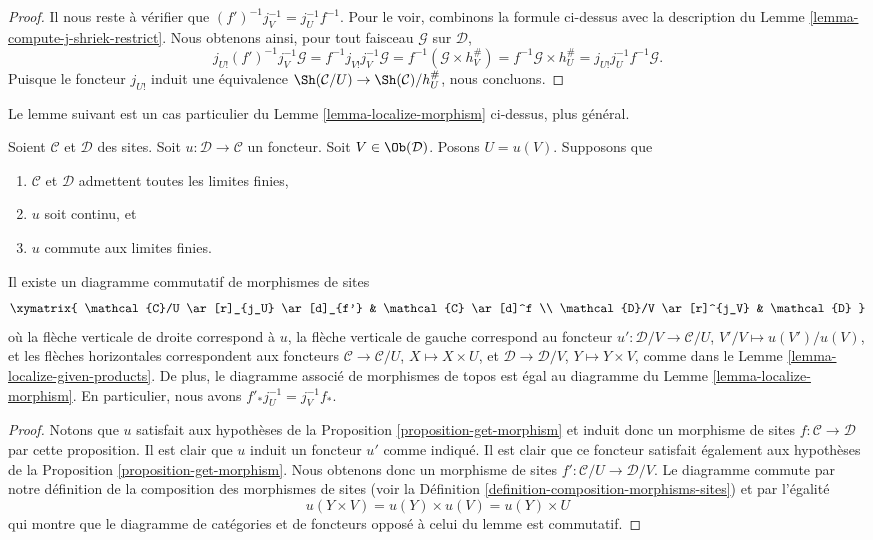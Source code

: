 \begin{proof}
\medskip\noindent
Il nous reste à vérifier que $(f')^{-1}j_V^{-1} = j_U^{-1}f^{-1}$.
Pour le voir, combinons la formule ci-dessus avec la description
du Lemme \ref{lemma-compute-j-shriek-restrict}. Nous obtenons ainsi,
pour tout faisceau $\mathcal{G}$ sur $\mathcal{D}$,
$$
j_{U!}(f')^{-1}j_V^{-1}\mathcal{G}
=
f^{-1}j_{V!}j_V^{-1}\mathcal{G}
=
f^{-1}(\mathcal{G} \times h_V^\#)
=
f^{-1}\mathcal{G} \times h_U^\#
=
j_{U!}j_U^{-1}f^{-1}\mathcal{G}.
$$
Puisque le foncteur $j_{U!}$ induit une équivalence
$\Sh(\mathcal{C}/U) \to \Sh(\mathcal{C})/h_U^\#$,
nous concluons.
\end{proof}

\noindent
Le lemme suivant est un cas particulier du
Lemme \ref{lemma-localize-morphism}
ci-dessus, plus général.

\begin{lemma}
\label{lemma-localize-morphism-strong}
Soient $\mathcal{C}$ et $\mathcal{D}$ des sites.
Soit $u : \mathcal{D} \to \mathcal{C}$ un foncteur.
Soit $V \in \Ob(\mathcal{D})$. Posons $U = u(V)$.
Supposons que
\begin{enumerate}
\item $\mathcal{C}$ et $\mathcal{D}$ admettent
toutes les limites finies,
\item $u$ soit continu, et
\item $u$ commute aux limites finies.
\end{enumerate}
Il existe un diagramme commutatif de morphismes de sites
$$
\xymatrix{
\mathcal{C}/U \ar[r]_{j_U} \ar[d]_{f'} & \mathcal{C} \ar[d]^f \\
\mathcal{D}/V \ar[r]^{j_V} & \mathcal{D}
}
$$
où la flèche verticale de droite correspond à $u$,
la flèche verticale de gauche correspond au
foncteur $u' : \mathcal{D}/V \to \mathcal{C}/U$, $V'/V \mapsto u(V')/u(V)$,
et les flèches horizontales correspondent aux foncteurs
$\mathcal{C} \to \mathcal{C}/U$, $X \mapsto X \times U$,
et $\mathcal{D} \to \mathcal{D}/V$, $Y \mapsto Y \times V$,
comme dans le Lemme \ref{lemma-localize-given-products}.
De plus, le diagramme associé de morphismes de topos est
égal au diagramme du
Lemme \ref{lemma-localize-morphism}.
En particulier, nous avons $f'_*j_U^{-1} = j_V^{-1}f_*$.
\end{lemma}

\begin{proof}
Notons que $u$ satisfait aux hypothèses de la
Proposition \ref{proposition-get-morphism} et induit donc
un morphisme de sites $f : \mathcal{C} \to \mathcal{D}$ par cette proposition.
Il est clair que $u$ induit un foncteur $u'$ comme indiqué.
Il est clair que ce foncteur satisfait également aux hypothèses de la
Proposition \ref{proposition-get-morphism}.
Nous obtenons donc un morphisme de sites $f' : \mathcal{C}/U \to \mathcal{D}/V$.
Le diagramme commute par notre définition de la composition des morphismes de
sites (voir la Définition \ref{definition-composition-morphisms-sites})
et par l’égalité
$$
u(Y \times V) = u(Y) \times u(V) = u(Y) \times U
$$
qui montre que le diagramme de catégories et de foncteurs opposé
à celui du lemme est commutatif.
\end{proof}

